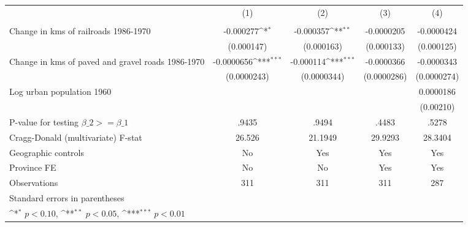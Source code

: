 {
\def\sym#1{\ifmmode^{#1}\else\(^{#1}\)\fi}
\begin{tabular}{l*{4}{c}}
\hline\hline
                &\multicolumn{1}{c}{(1)}&\multicolumn{1}{c}{(2)}&\multicolumn{1}{c}{(3)}&\multicolumn{1}{c}{(4)}\\
                &\multicolumn{1}{c}{}&\multicolumn{1}{c}{}&\multicolumn{1}{c}{}&\multicolumn{1}{c}{}\\
\hline
Change in kms of railroads 1986-1970&-0.000277\sym{*}  &-0.000357\sym{**} &-0.0000205         &-0.0000424         \\
                &(0.000147)         &(0.000163)         &(0.000133)         &(0.000125)         \\
[1em]
Change in kms of paved and gravel roads 1986-1970&-0.0000656\sym{***}&-0.000114\sym{***}&-0.0000366         &-0.0000343         \\
                &(0.0000243)         &(0.0000344)         &(0.0000286)         &(0.0000274)         \\
[1em]
Log urban population 1960&                  &                  &                  &0.0000186         \\
                &                  &                  &                  &(0.00210)         \\
\hline
P-value for testing $\beta\_{2} >= \beta\_{1}$&    .9435         &    .9494         &    .4483         &    .5278         \\
Cragg-Donald (multivariate) F-stat&   26.526         &  21.1949         &  29.9293         &  28.3404         \\
Geographic controls&       No         &      Yes         &      Yes         &      Yes         \\
Province FE     &       No         &       No         &      Yes         &      Yes         \\
Observations    &      311         &      311         &      311         &      287         \\
\hline\hline
\multicolumn{5}{l}{\footnotesize Standard errors in parentheses}\\
\multicolumn{5}{l}{\footnotesize \sym{*} \(p<0.10\), \sym{**} \(p<0.05\), \sym{***} \(p<0.01\)}\\
\end{tabular}
}
